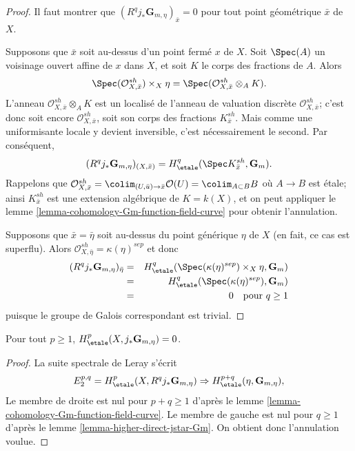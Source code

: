 \begin{proof}
Il faut montrer que $(R^q j_*\mathbf{G}_{m, \eta})_{\bar x} = 0$ pour tout
point géométrique $\bar x$ de $X$.

\medskip\noindent
Supposons que $\bar x$ soit au-dessus d'un point fermé $x$ de $X$. Soit $\Spec(A)$
un voisinage ouvert affine de $x$ dans $X$, et soit $K$ le corps des fractions
de $A$. Alors
$$
\Spec(\mathcal{O}^{sh}_{X, \bar x}) \times_X \eta =
\Spec(\mathcal{O}^{sh}_{X, \bar x} \otimes_A K).
$$
L'anneau $\mathcal{O}^{sh}_{X, \bar x} \otimes_A K$ est un localisé de
l'anneau de valuation discrète $\mathcal{O}^{sh}_{X, \bar x}$; c'est donc soit
encore $\mathcal{O}^{sh}_{X, \bar x}$, soit son corps des fractions
$K^{sh}_{\bar x}$. Mais comme une uniformisante locale y devient inversible, c'est
nécessairement le second. Par conséquent,
$$
(R^q j_*\mathbf{G}_{m, \eta})_{(X, \bar x)} = H_\etale^q(\Spec
K^{sh}_{\bar x}, \mathbf{G}_m).
$$
Rappelons que $\mathcal{O}^{sh}_{X, \bar x} =
\colim_{(U, \bar u) \to \bar x} \mathcal{O}(U) = \colim_{A \subset B} B$
où $A \to B$ est étale; ainsi $K^{sh}_{\bar x}$ est une extension algébrique
de $K = k(X)$, et on peut appliquer le
lemme \ref{lemma-cohomology-Gm-function-field-curve}
pour obtenir l'annulation.

\medskip\noindent
Supposons que $\bar x = \bar \eta$ soit au-dessus du point générique $\eta$ de $X$ (en
fait, ce cas est superflu). Alors
$\mathcal{O}^{sh}_{X, \bar \eta} = \kappa(\eta)^{sep}$ et donc
\begin{eqnarray*}
(R^q j_*\mathbf{G}_{m, \eta})_{\bar \eta}
& = &
H_\etale^q(\Spec(\kappa(\eta)^{sep}) \times_X \eta, \mathbf{G}_m) \\
& = & H_\etale^q (\Spec(\kappa(\eta)^{sep}), \mathbf{G}_m) \\
& = & 0 \ \ \text{ pour } q \geq 1
\end{eqnarray*}
puisque le groupe de Galois correspondant est trivial.
\end{proof}

\begin{lemma}
\label{lemma-cohomology-jstar-Gm}
Pour tout $p \geq 1$, $H_\etale^p(X, j_*\mathbf{G}_{m, \eta}) = 0$.
\end{lemma}

\begin{proof}
La suite spectrale de Leray s'écrit
$$
E_2^{p, q} = H_\etale^p(X, R^qj_*\mathbf{G}_{m, \eta}) \Rightarrow
H_\etale^{p+q}(\eta, \mathbf{G}_{m, \eta}),
$$
Le membre de droite est nul pour $p + q \geq 1$ d'après le
lemme \ref{lemma-cohomology-Gm-function-field-curve}.
Le membre de gauche est nul pour $q \geq 1$ d'après le
lemme \ref{lemma-higher-direct-jstar-Gm}. On obtient donc l'annulation voulue.
\end{proof}

